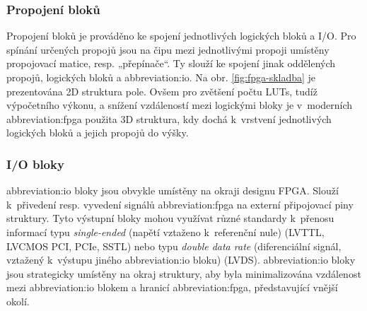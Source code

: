 \documentclass[a4paper, twoside, 11pt]{article}
\begin{document}
		\subsubsection{Propojení bloků}
			Propojení bloků je prováděno ke spojení jednotlivých logických bloků a I/O. Pro spínání určených propojů jsou na čipu mezi jednotlivými propoji umístěny propojovací matice, resp. „přepínače“. Ty slouží ke spojení jinak oddělených propojů, logických bloků a \gls{abbreviation:io}. \cite{Sass2010}
			Na obr. \ref{fig:fpga-skladba} je prezentována 2D struktura pole. Ovšem pro zvětšení počtu LUTs, tudíž výpočetního výkonu, a snížení vzdáleností mezi logickými bloky je v~moderních \gls{abbreviation:fpga} použita 3D struktura, kdy dochá k~vrstvení jednotlivých logických bloků a jejich propojů do výšky. \cite{pang-beginning-fpga}

		\subsubsection{I/O bloky}
		\gls{abbreviation:io} bloky jsou obvykle umístěny na okraji designu FPGA. Slouží k~přivedení resp. vyvedení signálů \gls{abbreviation:fpga} na externí připojovací piny struktury. Tyto výstupní bloky mohou využívat různé standardy k~přenosu informací typu \textit{single-ended} (napětí vztaženo k~referenční nule) (LVTTL, LVCMOS PCI, PCIe, SSTL) nebo typu \textit{double data rate} (diferenciální signál, vztažený k~výstupu jiného \gls{abbreviation:io} bloku) (LVDS). \gls{abbreviation:io} bloky jsou strategicky umístěny na okraj struktury, aby byla minimalizována vzdálenost mezi \gls{abbreviation:io} blokem a hranicí \gls{abbreviation:fpga}, představující vnější okolí. \cite{Sass2010} \cite{pang-beginning-fpga}
\end{document}
